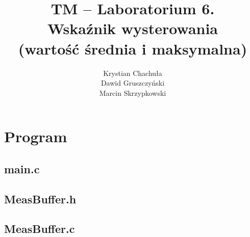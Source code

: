 \documentclass[fleqn]{article}
\title{TM -- Laboratorium 6. \\ \large Wskaźnik wysterowania \\ (wartość średnia i maksymalna)}
\author{Krystian Chachuła \\ Dawid Gruszczyński \\ Marcin Skrzypkowski}
\begin{document}
\maketitle

\setcounter{page}{0}
\thispagestyle{empty}

\pagebreak

\setcounter{page}{1}

\section{Program}
\subsection{main.c}

\begin{minipage}[t]{.49\textwidth}
	
\end{minipage}\hfill
\noindent\begin{minipage}[t]{.49\textwidth}
	
\end{minipage}\hfill

\begin{minipage}[t]{.49\textwidth}
	
\end{minipage}\hfill
\noindent\begin{minipage}[t]{.49\textwidth}
	\subsection{MeasBuffer.h}
	
	\subsection{MeasBuffer.c}
	
\end{minipage}\hfill
\end{document}
